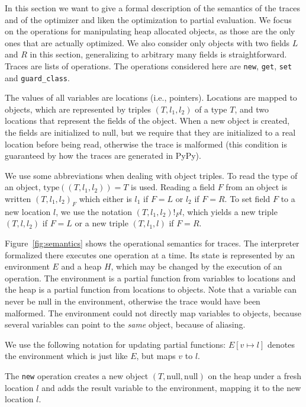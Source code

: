 \documentclass{sigplanconf}
\newcommand\ie{i.e.,\xspace}
\begin{document}
In this section we want to give a formal description of the semantics of the
traces and of the optimizer and liken the optimization to partial evaluation.
We focus on the operations for manipulating heap allocated objects,
as those are the only ones that are actually optimized. We also consider only
objects with two fields $L$ and $R$ in this section, generalizing to arbitrary many fields
is straightforward. Traces are lists of operations. The operations considered here are
\lstinline{new}, \lstinline{get}, \lstinline{set} and \lstinline{guard_class}.

The values of all
variables are locations (\ie pointers). Locations are mapped to objects, which
are represented by triples $(T,l_1,l_2)$ of a type $T$, and two locations that represent the
fields of the object. When a new object is created, the fields are initialized
to null, but we require that they are initialized to a real
location before being read, otherwise the trace is malformed (this condition is
guaranteed by how the traces are generated in PyPy).

We use some abbreviations when dealing with object triples. To read the type of
an object, $\mathrm{type}((T,l_1,l_2))=T$ is used. Reading a field $F$ from an
object is written $(T,l_1,l_2)_F$ which either is $l_1$ if $F=L$ or $l_2$
if $F=R$. To set field $F$ to a new location $l$, we use the notation
$(T,l_1,l_2)!_Fl$, which yields a new triple $(T,l,l_2)$ if $F=L$ or a new
triple $(T,l_1,l)$ if $F=R$.

Figure~\ref{fig:semantics} shows the operational semantics for traces. The
interpreter formalized there executes one operation at a time. Its state is
represented by an environment $E$ and a heap $H$, which may be changed by the
execution of an operation. The environment is a partial function from variables
to locations and the heap is a partial function from locations to objects. Note
that a variable can never be null in the environment, otherwise the trace would have
been malformed. The environment could not directly map variables to objects,
because several variables can point to the \emph{same} object, because of aliasing. 

We use the following notation for updating partial functions:
$E[v\mapsto l]$ denotes the environment which is just like $E$, but maps $v$ to
$l$.

The \lstinline{new} operation creates a new object $(T,\mathrm{null},\mathrm{null})$ on the
heap under a fresh location $l$ and adds the result variable to the environment,
mapping it to the new location $l$.
\end{document}
